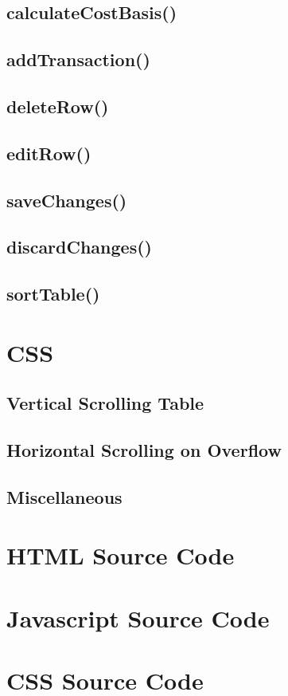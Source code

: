 \documentclass[letterpaper]{article}
\begin{document}
\subsection{calculateCostBasis()}

\subsection{addTransaction()}

\subsection{deleteRow()}

\subsection{editRow()}

\subsection{saveChanges()}

\subsection{discardChanges()}

\subsection{sortTable()}

\newpage

\section{CSS}\label{CSS}

\subsection{Vertical Scrolling Table}

\subsection{Horizontal Scrolling on Overflow}\label{overflow-x}

\subsection{Miscellaneous}

\newpage

\appendix
\section{HTML Source Code}


\newpage

\section{Javascript Source Code}


\newpage

\section{CSS Source Code}

\end{document}
